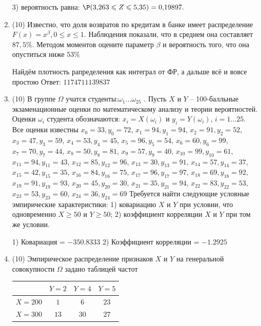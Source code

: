 \documentclass[a4paper,14pt]{article}
\begin{document}
\begin{enumerate}
3) вероятность равна:
$
\P(3,\!263\leqslant Z\leqslant 5,\!35)=
0,\!19897.
$


\item


(10) Известно, что доля возвратов по кредитам в банке имеет распределение $F(x) = x ^{\beta}, 0 \leqslant x \leqslant 1$.
Наблюдения показали, что в среднем она составляет $87,5\%$. Методом моментов оцените параметр $\beta$ и
вероятность того, что она опуститься ниже $53\%$




Найдём плотность рапределения как интеграл от ФР, а дальше всё и вовсе простою Ответ: $1174711139837$


\item


(10) В группе $\Omega$ учатся студенты:$\omega _{1}...\omega _{25}$ . Пусть $X$ и $Y$ – 100-балльные экзаменационные оценки по
математическому анализу и теории вероятностей. Оценки $\omega _{i}$ студента обозначаются: $x _{i} = X(\omega _{i})$ и $y _{i} = Y(\omega _{i})$, $i = 1...25$. Все оценки известны
$x _{0} = 33, y _{0} = 72$, $x _{1} = 94, y _{1} = 94$, $x _{2} = 91, y _{2} = 52$, $x _{3} = 47, y _{3} = 59$, $x _{4} = 53, y _{4} = 45$, $x _{5} = 96, y _{5} = 54$, $x _{6} = 60, y _{6} = 99$, $x _{7} = 70, y _{7} = 44$, $x _{8} = 50, y _{8} = 81$, $x _{9} = 57, y _{9} = 40$, $x _{10} = 99, y _{10} = 61$, $x _{11} = 94, y _{11} = 43$, $x _{12} = 85, y _{12} = 96$, $x _{13} = 30, y _{13} = 91$, $x _{14} = 57, y _{14} = 37$, $x _{15} = 42, y _{15} = 35$, $x _{16} = 84, y _{16} = 75$, $x _{17} = 96, y _{17} = 97$, $x _{18} = 69, y _{18} = 92$, $x _{19} = 91, y _{19} = 93$, $x _{20} = 45, y _{20} = 30$, $x _{21} = 35, y _{21} = 94$, $x _{22} = 83, y _{22} = 53$, $x _{23} = 53, y _{23} = 60$, $x _{24} = 36, y _{24} = 69$
Требуется
найти следующие условные эмпирические характеристики: 1) ковариацию $X$ и $Y$ при условии, что одновременно $X \geqslant 50$
 и $Y \geqslant 50$; 2) коэффициент корреляции $X$ и $Y$ при том же условии.




1) Ковариация = $-350.8333$
2) Коэффициент корреляции = $-1.2925$


\item


(10) Эмпирическое распределение признаков $X$ и $Y$ на генеральной совокупности $\Omega$ задано таблицей частот  
 
\begin{tabular}{ | c | c | c | c | }
\hline
 & $Y = 2$ & $Y = 4$ & $Y = 5$  \\ \hline
$X = 200$ & $1$ & $6$ & $23$\\ \hline
$X = 300$ & $13$ & $30$ & $27$\\
\hline
\end{tabular}


\end{enumerate}
\end{document}

